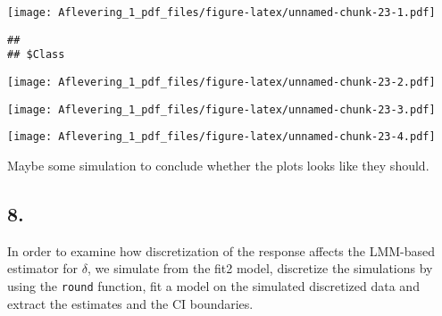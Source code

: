 \documentclass[
]{article}
\newenvironment{Shaded}{\begin{snugshade}}{\end{snugshade}}
\newcommand{\AttributeTok}[1]{\textcolor[rgb]{0.13,0.29,0.53}{#1}}
\newcommand{\DecValTok}[1]{\textcolor[rgb]{0.00,0.00,0.81}{#1}}
\newcommand{\FunctionTok}[1]{\textcolor[rgb]{0.13,0.29,0.53}{\textbf{#1}}}
\newcommand{\NormalTok}[1]{#1}
\newcommand{\SpecialCharTok}[1]{\textcolor[rgb]{0.81,0.36,0.00}{\textbf{#1}}}
\newcommand{\StringTok}[1]{\textcolor[rgb]{0.31,0.60,0.02}{#1}}
\begin{document}
\texttt{[image: Aflevering\_1\_pdf\_files/figure-latex/unnamed-chunk-23-1.pdf]}

\begin{verbatim}
## 
## $Class
\end{verbatim}

\texttt{[image: Aflevering\_1\_pdf\_files/figure-latex/unnamed-chunk-23-2.pdf]}

\begin{Shaded}
\end{Shaded}

\texttt{[image: Aflevering\_1\_pdf\_files/figure-latex/unnamed-chunk-23-3.pdf]}

\begin{Shaded}
\end{Shaded}

\texttt{[image: Aflevering\_1\_pdf\_files/figure-latex/unnamed-chunk-23-4.pdf]}

Maybe some simulation to conclude whether the plots looks like they
should.

\subsection{8.}\label{section-8}

In order to examine how discretization of the response affects the
LMM-based estimator for \(\delta\), we simulate from the fit2 model,
discretize the simulations by using the \texttt{round} function, fit a
model on the simulated discretized data and extract the estimates and
the CI boundaries.
\end{document}
